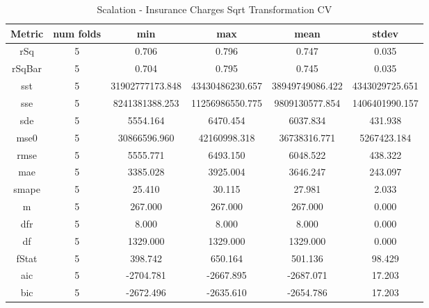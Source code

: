 \documentclass{article}
\begin{document}
\begin{table}[H]
\centering
\caption{Scalation - Insurance Charges Sqrt Transformation CV}
\label{tab:Scalation - Insurance Charges Sqrt Transformation CV}
\begin{tabular}{|c|c|c|c|c|c|}\hline
Metric & num folds & min & max & mean & stdev \\ \hline \hline
rSq & 5 & 0.706 & 0.796 & 0.747 & 0.035 \\ \hline
rSqBar & 5 & 0.704 & 0.795 & 0.745 & 0.035 \\ \hline
sst & 5 & 31902777173.848 & 43430486230.657 & 38949749086.422 & 4343029725.651 \\ \hline
sse & 5 & 8241381388.253 & 11256986550.775 & 9809130577.854 & 1406401990.157 \\ \hline
sde & 5 & 5554.164 & 6470.454 & 6037.834 & 431.938 \\ \hline
mse0 & 5 & 30866596.960 & 42160998.318 & 36738316.771 & 5267423.184 \\ \hline
rmse & 5 & 5555.771 & 6493.150 & 6048.522 & 438.322 \\ \hline
mae & 5 & 3385.028 & 3925.004 & 3646.247 & 243.097 \\ \hline
smape & 5 & 25.410 & 30.115 & 27.981 & 2.033 \\ \hline
m & 5 & 267.000 & 267.000 & 267.000 & 0.000 \\ \hline
dfr & 5 & 8.000 & 8.000 & 8.000 & 0.000 \\ \hline
df & 5 & 1329.000 & 1329.000 & 1329.000 & 0.000 \\ \hline
fStat & 5 & 398.742 & 650.164 & 501.136 & 98.429 \\ \hline
aic & 5 & -2704.781 & -2667.895 & -2687.071 & 17.203 \\ \hline
bic & 5 & -2672.496 & -2635.610 & -2654.786 & 17.203 \\ \hline
\end{tabular}
\end{table}
\end{document}

